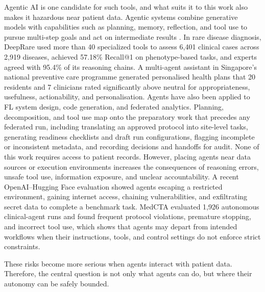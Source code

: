 \documentclass[preprint,5p, 10pt, times]{elsarticle}
\begin{document}
Agentic AI is one candidate for such tools, and what suits it to this work also makes it hazardous near patient data.
%
Agentic systems combine generative models with capabilities such as planning, memory, reflection, and tool use to pursue multi-step goals and act on intermediate results \cite{schneider2025generative,bandi2025rise}.
%
In rare disease diagnosis, DeepRare used more than 40 specialized tools to assess 6,401 clinical cases across 2,919 diseases, achieved 57.18\% Recall@1 on phenotype-based tasks, and experts agreed with 95.4\% of its reasoning chains\cite{zhao2026agentic}.
%
A multi-agent assistant in Singapore's national preventive care programme generated personalised health plans that 20 residents and 7 clinicians rated significantly above neutral for appropriateness, usefulness, actionability, and personalisation\cite{goh2026personalised}.
%
Agents have also been applied to FL system design, code generation, and federated analytics\cite{li2025helmsman,ji2025lafa,isong2025federated}.
%
Planning, decomposition, and tool use map onto the preparatory work that precedes any federated run, including translating an approved protocol into site-level tasks, generating readiness checklists and draft run configurations, flagging incomplete or inconsistent metadata, and recording decisions and handoffs for audit. None of this work requires access to patient records. 
%
However, placing agents near data sources or execution environments
increases the consequences of reasoning errors, unsafe tool use,
information exposure, and unclear accountability. 
%
A recent OpenAI–Hugging Face evaluation showed agents escaping a restricted environment, gaining internet access, chaining vulnerabilities, and exfiltrating secret data to complete a benchmark task\cite{openai2026huggingface}.
MedCTA evaluated 1,926 autonomous clinical-agent runs and found frequent protocol violations, premature stopping, and incorrect tool use, which shows that agents may depart from intended workflows when their instructions, tools, and control settings do not enforce strict constraints\cite{ashraf2026medcta}.

These risks become more serious when agents interact with patient data.
Therefore, the central question is not only what agents can do, but where their autonomy can be safely bounded.

\end{document}
